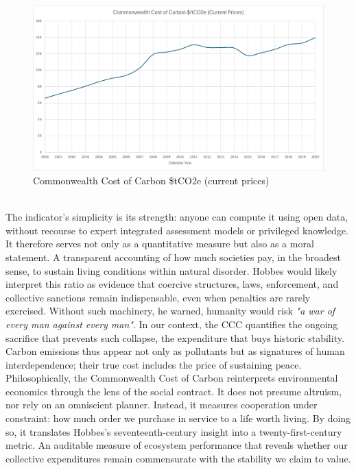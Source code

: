 \documentclass[12pt, oneside]{article}   	%
\begin{document}
\begin{figure}[H]
\centering
\includegraphics[width=1\textwidth]{ccc}
\caption{Commonwealth Cost of Carbon \$tCO2e (current prices)}
\label{CCC figure}
\end{figure}\\

The indicator’s simplicity is its strength: anyone can compute it using open data, without recourse to expert integrated assessment models or privileged knowledge.
It therefore serves not only as a quantitative measure but also as a moral statement.
A transparent accounting of how much societies pay, in the broadest sense, to sustain living conditions within natural disorder.
Hobbes would likely interpret this ratio as evidence that coercive structures, laws, enforcement, and collective sanctions remain indispensable, even when penalties are rarely exercised.
Without such machinery, he warned, humanity would risk \emph{"a war of every man against every man"}.
In our context, the CCC quantifies the ongoing sacrifice that prevents such collapse, the expenditure that buys historic stability.
Carbon emissions thus appear not only as pollutants but as signatures of human interdependence; their true cost includes the price of sustaining peace.
Philosophically, the Commonwealth Cost of Carbon reinterprets environmental economics through the lens of the social contract.
It does not presume altruism, nor rely on an omniscient planner.
Instead, it measures cooperation under constraint: how much order we purchase in service to a life worth living.
By doing so, it translates Hobbes’s seventeenth-century insight into a twenty-first-century metric.
An auditable measure of ecosystem performance that reveals whether our collective expenditures remain commensurate with the stability we claim to value.\\
\end{document}
